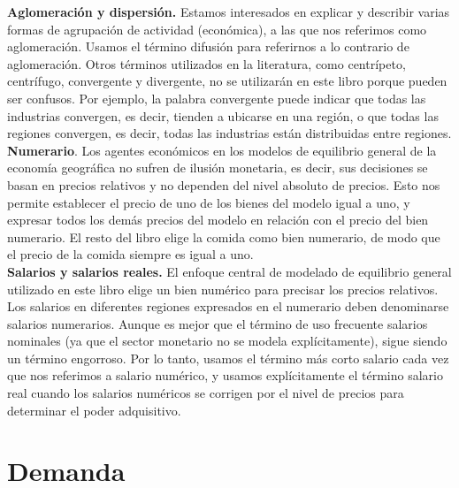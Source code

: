 \textbf{Aglomeración y dispersión.} Estamos interesados en explicar y describir varias formas de agrupación de actividad (económica), a las que nos referimos como aglomeración. Usamos el término difusión para referirnos a lo contrario de aglomeración. Otros términos utilizados en la literatura, como centrípeto, centrífugo, convergente y divergente, no se utilizarán en este libro porque pueden ser confusos. Por ejemplo, la palabra convergente puede indicar que todas las industrias convergen, es decir, tienden a ubicarse en una región, o que todas las regiones convergen, es decir, todas las industrias están distribuidas entre regiones.\\
\textbf{Numerario}. Los agentes económicos en los modelos de equilibrio general de la economía geográfica no sufren de ilusión monetaria, es decir, sus decisiones se basan en precios relativos y no dependen del nivel absoluto de precios. Esto nos permite establecer el precio de uno de los bienes del modelo igual a uno, y expresar todos los demás precios del modelo en relación con el precio del bien numerario. El resto del libro elige la comida como bien numerario, de modo que el precio de la comida siempre es igual a uno.\\
\textbf{Salarios y salarios reales.} El enfoque central de modelado de equilibrio general utilizado en este libro elige un bien numérico para precisar los precios relativos. Los salarios en diferentes regiones expresados en el numerario deben denominarse salarios numerarios. Aunque es mejor que el término de uso frecuente salarios nominales (ya que el sector monetario no se modela explícitamente), sigue siendo un término engorroso. Por lo tanto, usamos el término más corto salario cada vez que nos referimos a salario numérico, y usamos explícitamente el término salario real cuando los salarios numéricos se corrigen por el nivel de precios para determinar el poder adquisitivo.

\section{Demanda}

